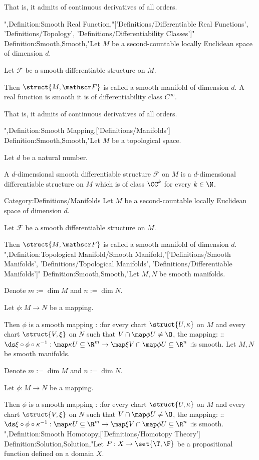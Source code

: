 That is,  it admits of continuous derivatives of all orders.


",Definition:Smooth Real Function,"['Definitions/Differentiable Real Functions', 'Definitions/Topology', 'Definitions/Differentiability Classes']"
Definition:Smooth,Smooth,"Let $M$ be a second-countable locally Euclidean space of dimension $d$. 

Let $\mathscr F$ be a smooth differentiable structure on $M$.


Then $\struct {M, \mathscr F}$ is called a smooth manifold of dimension $d$.
A real function is smooth  it is of differentiability class $C^\infty$.

That is,  it admits of continuous derivatives of all orders.



",Definition:Smooth Mapping,['Definitions/Manifolds']
Definition:Smooth,Smooth,"Let $M$ be a topological space.

Let $d$ be a natural number.


A $d$-dimensional smooth differentiable structure $\mathscr F$ on $M$ is a $d$-dimensional differentiable structure on $M$ which is of class $\CC^k$ for every $k \in \N$.

Category:Definitions/Manifolds
Let $M$ be a second-countable locally Euclidean space of dimension $d$. 

Let $\mathscr F$ be a smooth differentiable structure on $M$.


Then $\struct {M, \mathscr F}$ is called a smooth manifold of dimension $d$.
",Definition:Topological Manifold/Smooth Manifold,"['Definitions/Smooth Manifolds', 'Definitions/Topological Manifolds', 'Definitions/Differentiable Manifolds']"
Definition:Smooth,Smooth,"Let $M, N$ be smooth manifolds. 

Denote $m := \dim M$ and $n := \dim N$. 

Let $\phi: M \to N$ be a mapping. 


Then $\phi$ is a smooth mapping :
:for every chart $\struct {U, \kappa}$ on $M$ and every chart $\struct {V, \xi}$ on $N$ such that $V \cap \map \phi U \ne \O$, the mapping:
::$\ds \xi \circ \phi \circ \kappa^{-1}: \map \kappa U \subseteq \R^m \to \map \xi {V \cap \map \phi U} \subseteq \R^n$
:is smooth.
Let $M, N$ be smooth manifolds. 

Denote $m := \dim M$ and $n := \dim N$. 

Let $\phi: M \to N$ be a mapping. 


Then $\phi$ is a smooth mapping :
:for every chart $\struct {U, \kappa}$ on $M$ and every chart $\struct {V, \xi}$ on $N$ such that $V \cap \map \phi U \ne \O$, the mapping:
::$\ds \xi \circ \phi \circ \kappa^{-1}: \map \kappa U \subseteq \R^m \to \map \xi {V \cap \map \phi U} \subseteq \R^n$
:is smooth.
",Definition:Smooth Homotopy,['Definitions/Homotopy Theory']
Definition:Solution,Solution,"Let $P: X \to \set {\T, \F}$ be a propositional function defined on a domain $X$.

